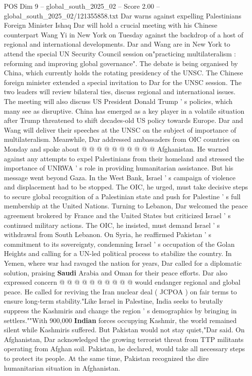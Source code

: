 \begin{textsample}{POS Dim 9 – global\_south\_2025\_02 – Score 2.00 – global\_south\_2025\_02/121355858.txt}  \label{ex:f9_pos_255}
Dar warns against expelling Palestinians Foreign Minister Ishaq Dar will hold a crucial meeting with his Chinese counterpart Wang Yi in New York on Tuesday against the backdrop of a host of regional and international developments.
Dar and Wang are in New York to attend the special UN Security Council session on"practicing multilateralism : reforming and improving global governance".
The debate is being organised by China, which currently holds the rotating presidency of the UNSC.
The Chinese foreign minister extended a special invitation to Dar for the UNSC session.
The two leaders will review bilateral ties, discuss regional and international issues.
The meeting will also discuss US President Donald Trump ' s policies, which many see as disruptive.
China has emerged as a key player in a volatile situation after Trump threatened to shift decades-old US policy towards Europe.
Dar and Wang will deliver their speeches at the UNSC on the subject of importance of multilateralism.
Meanwhile, Dar addressed ambassaders from OIC countries on Monday and spoke about @ @ @ @ @ @ @ @ @ @ Afghanistan.
He warned against any attempts to expel Palestinians from their homeland and stressed the importance of UNRWA ' s role in providing humanitarian assistance.
But his message went beyond Gaza.
In the West Bank, Israel ' s campaign of violence and displacement had to be stopped.
The OIC, he urged, must take decisive steps to secure global recognition of a Palestinian state and push for Palestine ' s full membership at the United Nations.
Turning to Lebanon, Dar welcomed the peace agreement brokered by France and the United States but criticized Israel ' s continued military actions.
The OIC, he insisted, must demand Israel ' s withdrawal from South Lebanon.
On Syria, he reaffirmed Pakistan ' s commitment to its sovereignty, condemning Israel ' s occupation of the Golan Heights and calling for a UN-led political process to stabilize the country.
In Yemen, where war had ravaged the nation for years, Dar called for a diplomatic solution, praising \textbf{Saudi} Arabia and Oman for their peace efforts.
Dar also expressed concern @ @ @ @ @ @ @ @ @ @ would endanger regional and global peace.
He called for reviving the Iran nuclear deal ( JCPOA ) on fair terms to ensure long-term stability."Like Israel in Palestine, India seeks to brutally suppress the Kashmiris and change the region ' s demographics by bringing in settlers.""With 900,000 \textbf{Indian} forces occupying Kashmir, the world remained silent while Kashmiris suffered.
But Pakistan would not stay quiet,"Dar said.
On Afghanistan, Dar acknowledged the growing terrorist threat from TTP militants operating from Afghan soil.
Pakistan, he declared, would take all necessary steps to protect its people.
At the same time, Pakistan recognized the dire humanitarian situation in Afghanistan.

\end{textsample}

